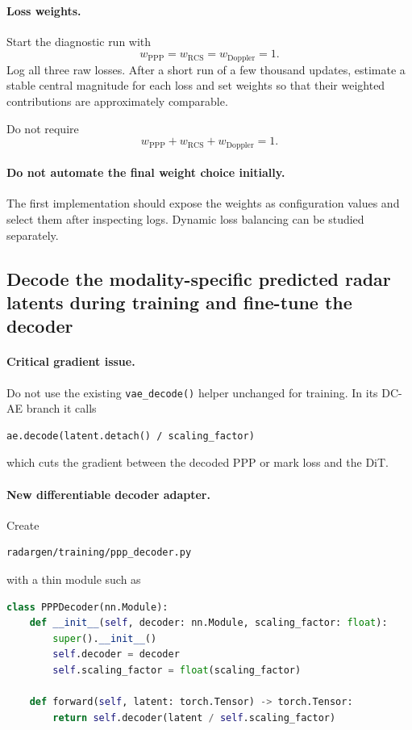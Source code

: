 \documentclass[11pt,a4paper]{article}
\begin{document}
\paragraph{Loss weights.}
Start the diagnostic run with
\[
    w_{\mathrm{PPP}}=
    w_{\mathrm{RCS}}=
    w_{\mathrm{Doppler}}=1.
\]
Log all three raw losses. After a short run of a few thousand updates, estimate a stable central magnitude for each loss and set weights so that their weighted contributions are approximately comparable.

Do not require
\[
    w_{\mathrm{PPP}}+w_{\mathrm{RCS}}+w_{\mathrm{Doppler}}=1.
\]

\paragraph{Do not automate the final weight choice initially.}
The first implementation should expose the weights as configuration values and select them after inspecting logs. Dynamic loss balancing can be studied separately.

\subsection{Decode the modality-specific predicted radar latents during training and fine-tune the decoder}

\paragraph{Critical gradient issue.}
Do not use the existing \texttt{vae\_decode()} helper unchanged for training. In its DC-AE branch it calls
\begin{lstlisting}
ae.decode(latent.detach() / scaling_factor)
\end{lstlisting}
which cuts the gradient between the decoded PPP or mark loss and the DiT.

\paragraph{New differentiable decoder adapter.}
Create
\begin{lstlisting}
radargen/training/ppp_decoder.py
\end{lstlisting}
with a thin module such as
\begin{lstlisting}[language=Python]
class PPPDecoder(nn.Module):
    def __init__(self, decoder: nn.Module, scaling_factor: float):
        super().__init__()
        self.decoder = decoder
        self.scaling_factor = float(scaling_factor)

    def forward(self, latent: torch.Tensor) -> torch.Tensor:
        return self.decoder(latent / self.scaling_factor)
\end{lstlisting}
\end{document}
